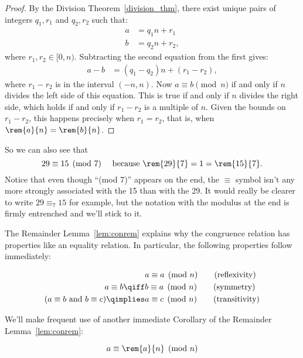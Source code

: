 \begin{proof}
By the Division Theorem~\ref{division_thm}, there exist unique pairs
of integers $q_1, r_1$ and $q_2, r_2$ such that:
%
\begin{align*}
a & = q_1 n + r_1\\
b & = q_2 n + r_2,
\end{align*}
where $r_1,r_2 \in [0,n)$.
Subtracting the second equation from the first gives:
\begin{align*}
a - b & = (q_1 - q_2) n + (r_1 - r_2),
\end{align*}
where $r_1 - r_2$ is in the interval $(-n,n)$.  Now $a \equiv b
\pmod{n}$ if and only if $n$ divides the left side of this equation.
This is true if and only if $n$ divides the right side, which holds if
and only if $r_1 - r_2$ is a multiple of $n$.  Given the bounds on
$r_1 - r_2$, this happens precisely when $r_1 = r_2$, that is, when
$\rem{a}{n} = \rem{b}{n}$.
\end{proof}

So we can also see that
\[
29 \equiv 15 \pmod{7} \quad\text{ because } \rem{29}{7} = 1 = \rem{15}{7}.
\]
Notice that even though ``(mod 7)'' appears on the end, the
$\equiv$ symbol isn't any more strongly associated with the 15
than with the 29.  It would really be clearer to write $29
\equiv_7 15$ for example, but the notation with the modulus at
the end is firmly entrenched and we'll stick to it.

The Remainder Lemma~\ref{lem:conrem} explains why the congruence
relation has properties like an equality relation.  In particular, the
following properties follow immediately:
\begin{lemma}\label{mod_equiv_rel_lem} \mbox{}
\begin{align}
                  & a \equiv a \pmod{n}\tag{reflexivity}\\
a \equiv b  \qiff & b \equiv a \pmod{n} \tag{symmetry}\\
(a \equiv b \text{ and }  b \equiv c) \qimplies & a \equiv c \pmod{n}
\tag{transitivity}
\end{align}
\end{lemma}


We'll make frequent use of another immediate Corollary of
the Remainder Lemma~\ref{lem:conrem}:
\begin{corollary}\label{aran}
\[
a \equiv \rem{a}{n} \pmod{n}
\]
\end{corollary}

